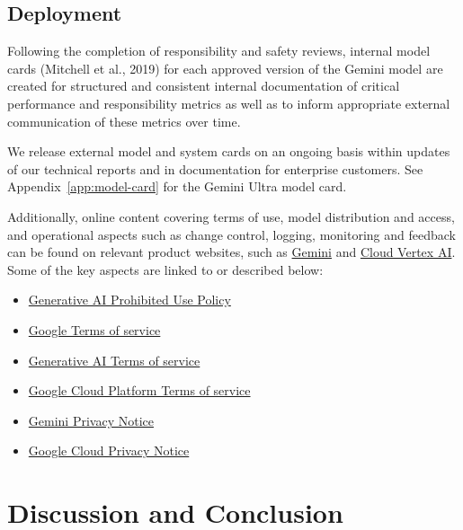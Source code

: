 \subsection{Deployment}

Following the completion of responsibility and safety reviews, internal model cards (Mitchell et al., 2019) for each approved version of the Gemini model are created for structured and consistent internal documentation of critical performance and responsibility metrics as well as to inform appropriate external communication of these metrics over time. 

We release external model and system cards on an ongoing basis within updates of our technical reports and in documentation for enterprise customers. See Appendix~\ref{app:model-card} for the Gemini Ultra model card. 

Additionally, online content covering terms of use, model distribution and access, and operational aspects such as change control, logging, monitoring and feedback can be found on relevant product websites, such as \href{https://gemini.google.com/faq}{Gemini} and \href{https://cloud.google.com/vertex-ai/docs}{Cloud Vertex AI}. Some of the key aspects are linked to or described below:

\begin{itemize}
\item \href{https://policies.google.com/terms/generative-ai/use-policy}{Generative AI Prohibited Use Policy}
\item \href{https://policies.google.com/terms}{Google Terms of service} 
\item \href{https://policies.google.com/terms/generative-ai}{Generative AI Terms of service}
\item \href{https://cloud.google.com/terms}{Google Cloud Platform Terms of service}
\item \href{https://support.google.com/gemini?p=privacy_notice}{Gemini Privacy Notice}
\item \href{https://cloud.google.com/terms/cloud-privacy-notice}{Google Cloud Privacy Notice}
\end{itemize}

\section{Discussion and Conclusion}
\label{discussion}

